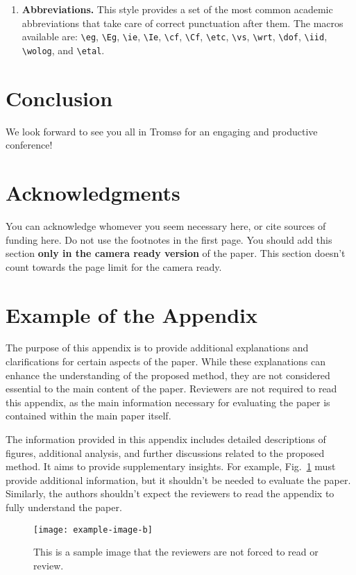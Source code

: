 \documentclass[abstract]{nldl}
\begin{document}
\begin{enumerate}[leftmargin=*]
In this style, we load the \verb|biblatex| package with the \verb|biber| backend.
You must ensure the right chain of compilation: \verb|LaTeX => Biber => LaTeX| (twice).
Many modern \LaTeX\ editors can streamline this process, match your editor preferences accordingly.

\item \textbf{Abbreviations.}
This style provides a set of the most common academic abbreviations that take care of correct punctuation after them.
The macros available are: \verb|\eg|, \verb|\Eg|, \verb|\ie|, \verb|\Ie|, \verb|\cf|, \verb|\Cf|, \verb|\etc|, \verb|\vs|, \verb|\wrt|, \verb|\dof|, \verb|\iid|, \verb|\wolog|, and \verb|\etal|.

\end{enumerate}

\section{Conclusion}
We look forward to see you all in Troms{\o} for an engaging and productive conference!

\section*{Acknowledgments}

You can acknowledge whomever you seem necessary here, or cite sources of funding here.
Do not use the footnotes in the first page.
You should add this section \textbf{only in the camera ready version} of the paper.
This section doesn't count towards the page limit for the camera ready.

\printbibliography

\appendix
\section{Example of the Appendix}

The purpose of this appendix is to provide additional explanations and clarifications for certain aspects of the paper.
While these explanations can enhance the understanding of the proposed method, they are not considered essential to the main content of the paper.
Reviewers are not required to read this appendix, as the main information necessary for evaluating the paper is contained within the main paper itself.

The information provided in this appendix includes detailed descriptions of figures, additional analysis, and further discussions related to the proposed method.
It aims to provide supplementary insights.
For example, Fig.~\ref{fig:sample-app} must provide additional information, but it shouldn't be needed to evaluate the paper.
Similarly, the authors shouldn't expect the reviewers to read the appendix to fully understand the paper.

\begin{figure}[tb]
  \centering
  \texttt{[image: example-image-b]}
  \caption{This is a sample image that the reviewers are not forced to read or review.}
  \label{fig:sample-app}
\end{figure}
\end{document}
